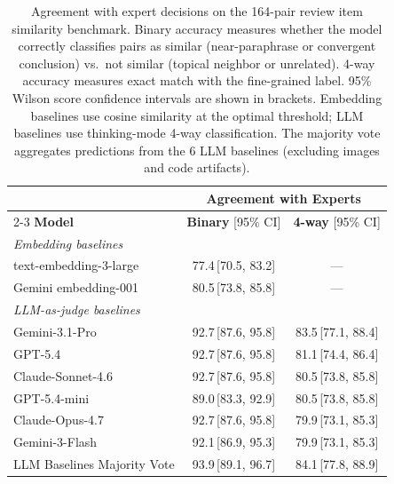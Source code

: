 \begin{table}[t]
\centering
\fontsize{7.5}{9.5}\selectfont
\setlength{\tabcolsep}{4pt}
\begin{tabular}{l cc}
\toprule
& \multicolumn{2}{c}{\textbf{Agreement with Experts}} \\
\cmidrule(lr){2-3}
\textbf{Model} & \textbf{Binary} {\scriptsize [95\% CI]} & \textbf{4-way} {\scriptsize [95\% CI]} \\
\midrule
\multicolumn{3}{l}{\textit{Embedding baselines}} \\
\quad text-embedding-3-large   & 77.4{\scriptsize\,[70.5, 83.2]} & --- \\
\quad Gemini embedding-001     & 80.5{\scriptsize\,[73.8, 85.8]} & --- \\
\midrule
\multicolumn{3}{l}{\textit{LLM-as-judge baselines}} \\
\quad Gemini-3.1-Pro           & 92.7{\scriptsize\,[87.6, 95.8]} & 83.5{\scriptsize\,[77.1, 88.4]} \\
\quad GPT-5.4                  & 92.7{\scriptsize\,[87.6, 95.8]} & 81.1{\scriptsize\,[74.4, 86.4]} \\
\quad Claude-Sonnet-4.6        & 92.7{\scriptsize\,[87.6, 95.8]} & 80.5{\scriptsize\,[73.8, 85.8]} \\
\quad GPT-5.4-mini             & 89.0{\scriptsize\,[83.3, 92.9]} & 80.5{\scriptsize\,[73.8, 85.8]} \\
\quad Claude-Opus-4.7          & 92.7{\scriptsize\,[87.6, 95.8]} & 79.9{\scriptsize\,[73.1, 85.3]} \\
\quad Gemini-3-Flash           & 92.1{\scriptsize\,[86.9, 95.3]} & 79.9{\scriptsize\,[73.1, 85.3]} \\
\midrule
\quad LLM Baselines Majority Vote & 93.9{\scriptsize\,[89.1, 96.7]} & 84.1{\scriptsize\,[77.8, 88.9]} \\
\bottomrule
\end{tabular}
\caption{Agreement with expert decisions on the 164-pair review item similarity benchmark.
Binary accuracy measures whether the model correctly classifies pairs as similar (near-paraphrase or convergent conclusion) vs.\ not similar (topical neighbor or unrelated).
4-way accuracy measures exact match with the fine-grained label.
95\% Wilson score confidence intervals are shown in brackets.
Embedding baselines use cosine similarity at the optimal threshold; LLM baselines use thinking-mode 4-way classification.
The majority vote aggregates predictions from the 6 LLM baselines (excluding images and code artifacts).}
\label{tab:similarity-bench}
\end{table}
